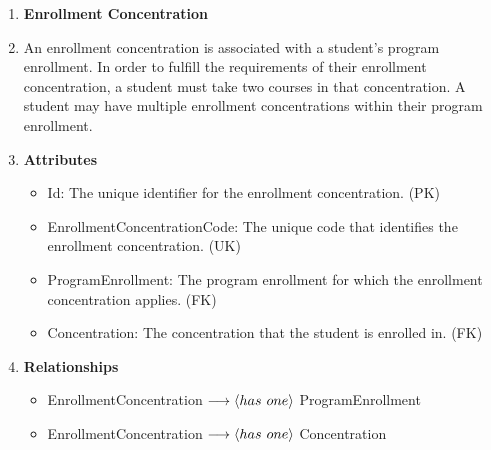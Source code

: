 \documentclass[12pt]{article}
\begin{document}
\begin{appendices}
\begin{enumerate}[label=(\roman*)]
    \item \textbf{Enrollment Concentration}
    \item[] An enrollment concentration is associated with a student's program enrollment. In order to fulfill the requirements of their enrollment concentration, a student must take two courses in that concentration. A student may have multiple enrollment concentrations within their program enrollment.
    \item[] \textbf{Attributes}
    \begin{itemize}
        \item Id: The unique identifier for the enrollment concentration. (PK)
        \item EnrollmentConcentrationCode: The unique code that identifies the enrollment concentration. (UK)
        \item ProgramEnrollment: The program enrollment for which the enrollment concentration applies. (FK)
        \item Concentration: The concentration that the student is enrolled in. (FK)
    \end{itemize}
    \item[] \textbf{Relationships}
    \begin{itemize}
        \item EnrollmentConcentration $ \longrightarrow \langle has \hspace{0.125cm} one \rangle $ ProgramEnrollment
        \item EnrollmentConcentration $ \longrightarrow \langle has \hspace{0.125cm} one \rangle $ Concentration
    \end{itemize}


\end{enumerate}
\end{appendices}
\end{document}
